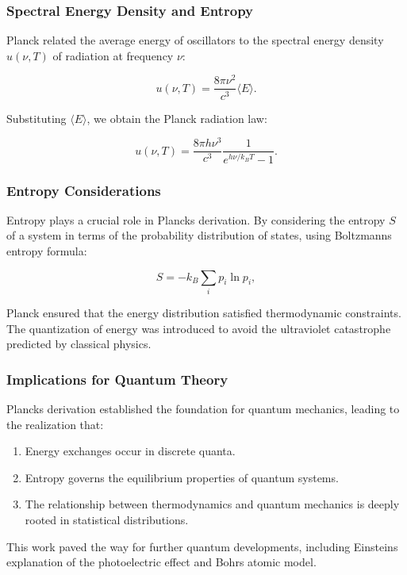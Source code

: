 \subsubsection*{Spectral Energy Density and Entropy}

Planck related the average energy of oscillators to the spectral energy density $u(\nu, T)$ of radiation at frequency $\nu$:

\begin{equation*}
    u(\nu, T) = \frac{8 \pi \nu^2}{c^3} \langle E \rangle.
\end{equation*}

Substituting $\langle E \rangle$, we obtain the Planck radiation law:

\begin{equation*}
    u(\nu, T) = \frac{8 \pi h \nu^3}{c^3} \frac{1}{e^{h \nu / k_B T} - 1}.
\end{equation*}

\subsubsection*{Entropy Considerations}

Entropy plays a crucial role in Planck\rqs s derivation. By considering the entropy $S$ of a system in terms of the probability distribution of states, using Boltzmann\rqs s entropy formula:

\begin{equation*}
    S = - k_B \sum_i p_i \ln p_i,
\end{equation*}

Planck ensured that the energy distribution satisfied thermodynamic constraints. The quantization of energy was introduced to avoid the ultraviolet catastrophe predicted by classical physics.

\subsubsection*{Implications for Quantum Theory}

Planck\rqs s derivation established the foundation for quantum mechanics, leading to the realization that:
\begin{enumerate}
    \item Energy exchanges occur in discrete quanta.
    \item Entropy governs the equilibrium properties of quantum systems.
    \item The relationship between thermodynamics and quantum mechanics is deeply rooted in statistical distributions.
\end{enumerate}

This work paved the way for further quantum developments, including Einstein\rqs s explanation of the photoelectric effect and Bohr\rqs s atomic model.

